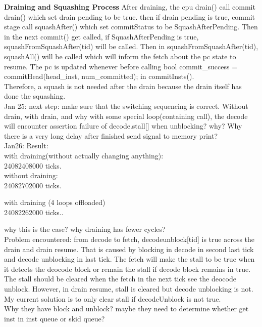 \documentclass[11pt]{article}
\begin{document}
\textbf{Draining and Squashing Process}
After draining, the cpu drain() call commit drain() which set drain pending to be true. then if drain pending is true, commit stage call squashAfter() which set commitStatus to be SquashAfterPending. Then in the next commit() get called, if SquashAfterPending is true, squashFromSquashAfter(tid) will be called. Then in squashFromSquashAfter(tid), squashAll() will be called which will inform the fetch about the pc state to resume. The pc is updated whenever before calling bool commit\_success = commitHead(head\_inst, num\_committed); in commitInsts().\\

Therefore, a squash is not needed after the drain because the drain itself has done the squashing.\\

Jan 25: next step: make sure that the switching sequencing is correct. Without drain, with drain, and why with some special loop(containing call), the decode will encounter assertion failure of decode.stall[] when unblocking? why? Why there is a very long delay after finished send signal to memory print?\\

Jan26: Result: \\

with draining(without actually changing anything):  \\24082408000 ticks.\\

without draining: \\24082702000 ticks.

with draining (4 loops offloaded) \\
24082262000 ticks..

why this is the case? why draining has fewer cycles?\\

Problem encountered: from decode to fetch, decodeunblock[tid] is true across the drain and drain resume. That is caused by blocking in decode in second last tick and decode unblocking in last tick. The fetch will make the stall to be true when it detects the deocode block or remain the stall if decode block remains in true. The stall should be cleared when the fetch in the next tick see the deocode unblock. However, in drain resume, stall is cleared but decode unblocking is not. \\

My current solution is to only clear stall if decodeUnblock is not true.\\

Why they have block and unblock? maybe they need to determine whether get inst in inst queue or skid queue?
\end{document}
